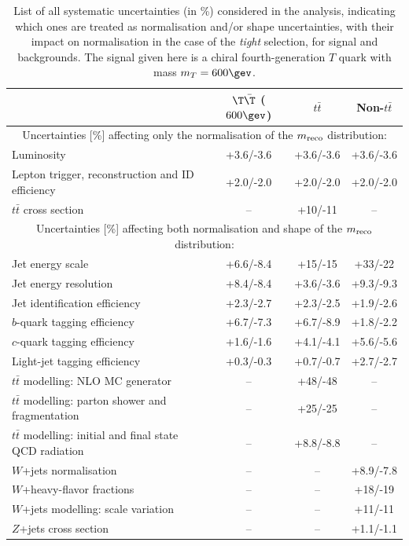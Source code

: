 \begin{table}[htb]
\centering
\caption{List of all systematic uncertainties (in \%) considered in the analysis, indicating which ones are treated
as normalisation and/or shape uncertainties, with their impact on normalisation in the case of the 
{\sl tight} selection, for signal and backgrounds. The signal given here is a chiral fourth-generation $T$ quark with mass $m_{T}=600\gev$.}
\begin{tabular}{l*{3}{c}}
\hline\hline
 & $\T\bar{\T}$ ($600\gev$) \rule{0pt}{2.6ex} \rule[-1.2ex]{0pt}{0pt} & $t\bar{t}$ & Non-$t\bar{t}$\\
\hline
\multicolumn{4}{c}{Uncertainties [\%] affecting only the normalisation of the $m_{\rm reco}$ distribution:}\\
Luminosity & +3.6/-3.6 & +3.6/-3.6 & +3.6/-3.6\\
Lepton trigger, reconstruction and ID efficiency & +2.0/-2.0 & +2.0/-2.0 & +2.0/-2.0\\
$t\bar{t}$ cross section & -- & +10/-11 & --\\
\hline
\multicolumn{4}{c}{Uncertainties [\%] affecting both normalisation and shape of the $m_{\rm reco}$ distribution:}\\
Jet energy scale & +6.6/-8.4 & +15/-15 & +33/-22\\  
Jet energy resolution & +8.4/-8.4 & +3.6/-3.6 & +9.3/-9.3\\ 
Jet identification efficiency & +2.3/-2.7 & +2.3/-2.5 & +1.9/-2.6\\  
$b$-quark tagging efficiency & +6.7/-7.3 & +6.7/-8.9 & +1.8/-2.2\\  
$c$-quark tagging efficiency & +1.6/-1.6 & +4.1/-4.1 & +5.6/-5.6\\  
Light-jet tagging efficiency & +0.3/-0.3 & +0.7/-0.7 & +2.7/-2.7\\  
$t\bar{t}$ modelling: NLO MC generator & -- & +48/-48 & --\\  
$t\bar{t}$ modelling: parton shower and fragmentation & -- & +25/-25 & --\\  
$t\bar{t}$ modelling: initial and final state QCD radiation & -- & +8.8/-8.8 & --\\   
$W$+jets normalisation & -- & -- & +8.9/-7.8\\  
$W$+heavy-flavor fractions & -- & -- & +18/-19\\  
$W$+jets modelling: scale variation & -- & -- & +11/-11\\  
$Z$+jets cross section & -- & -- & +1.1/-1.1\\ 

\end{tabular}
\end{table}
